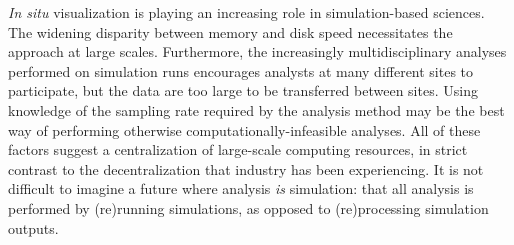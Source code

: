 

\textit{In situ} visualization is playing an increasing role in
simulation-based sciences.  The widening disparity between memory and
disk speed necessitates the approach at large scales.  Furthermore, the
increasingly multidisciplinary analyses performed on simulation runs
encourages analysts at many different sites to participate, but the
data are too large to be transferred between sites.  Using knowledge
of the sampling rate required by the analysis method may be the best
way of performing otherwise computationally-infeasible analyses.  All
of these factors suggest a centralization of large-scale computing
resources, in strict contrast to the decentralization that industry
has been experiencing.  It is not difficult to imagine a future where
analysis
\emph{is} simulation: that all analysis is performed by (re)running
simulations, as opposed to (re)processing simulation outputs.


